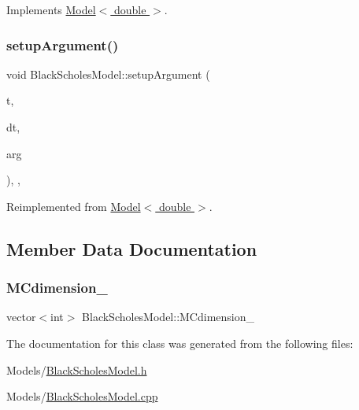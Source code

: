 Implements \hyperlink{class_model_a11fb36244c91ca8c36317581b73bca08}{Model$<$ double $>$}.

\hypertarget{class_black_scholes_model_a04a6ba4c59cd70a92dedbeb482e9d5aa}{}\label{class_black_scholes_model_a04a6ba4c59cd70a92dedbeb482e9d5aa} 
\subsubsection{\texorpdfstring{setup\+Argument()}{setupArgument()}}
{\footnotesize\ttfamily void Black\+Scholes\+Model\+::setup\+Argument (\begin{DoxyParamCaption}\item[{\hyperlink{_name_def_8h_ac2d3e0ba793497bcca555c7c2cf64ff3}{Time}}]{t,  }\item[{\hyperlink{_name_def_8h_ac2d3e0ba793497bcca555c7c2cf64ff3}{Time}}]{dt,  }\item[{\hyperlink{class_generic_random_variable_generator_1_1_argument}{Generic\+Random\+Variable\+Generator\+::\+Argument} $\ast$}]{arg }\end{DoxyParamCaption})\hspace{0.3cm}{\ttfamily [inline]}, {\ttfamily [override]}, {\ttfamily [virtual]}}



Reimplemented from \hyperlink{class_model_a19ba3a18a45aad9012dbc6cbafb09e39}{Model$<$ double $>$}.



\subsection{Member Data Documentation}
\hypertarget{class_black_scholes_model_a9457c1edc58d9f737f7eeeaaa6812488}{}\label{class_black_scholes_model_a9457c1edc58d9f737f7eeeaaa6812488} 
\subsubsection{\texorpdfstring{M\+Cdimension\+\_\+}{MCdimension\_}}
{\footnotesize\ttfamily vector$<$int$>$ Black\+Scholes\+Model\+::\+M\+Cdimension\+\_\+\hspace{0.3cm}{\ttfamily [private]}}



The documentation for this class was generated from the following files\+:\begin{DoxyCompactItemize}
\item 
Models/\hyperlink{_black_scholes_model_8h}{Black\+Scholes\+Model.\+h}\item 
Models/\hyperlink{_black_scholes_model_8cpp}{Black\+Scholes\+Model.\+cpp}\end{DoxyCompactItemize}
